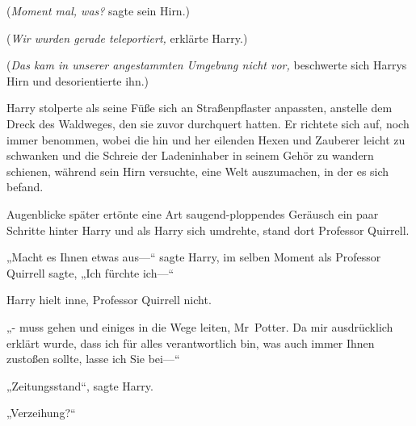 (\emph{Moment mal, was?} sagte sein Hirn.)

(\emph{Wir wurden gerade teleportiert,} erklärte Harry.)

(\emph{Das kam in unserer angestammten Umgebung nicht vor,} beschwerte sich Harrys Hirn und desorientierte ihn.)

Harry stolperte als seine Füße sich an Straßenpflaster anpassten, anstelle dem Dreck des Waldweges, den sie zuvor durchquert hatten. Er richtete sich auf, noch immer benommen, wobei die hin und her eilenden Hexen und Zauberer leicht zu schwanken und die Schreie der Ladeninhaber in seinem Gehör zu wandern schienen, während sein Hirn versuchte, eine Welt auszumachen, in der es sich befand.

Augenblicke später ertönte eine Art saugend-ploppendes Geräusch ein paar Schritte hinter Harry und als Harry sich umdrehte, stand dort Professor Quirrell.

„Macht es Ihnen etwas aus—“ sagte Harry, im selben Moment als Professor Quirrell sagte, „Ich fürchte ich—“

Harry hielt inne, Professor Quirrell nicht.

„- muss gehen und einiges in die Wege leiten, Mr~Potter. Da mir ausdrücklich erklärt wurde, dass ich für alles verantwortlich bin, was auch immer Ihnen zustoßen sollte, lasse ich Sie bei—“

„Zeitungsstand“, sagte Harry.

„Verzeihung?“

